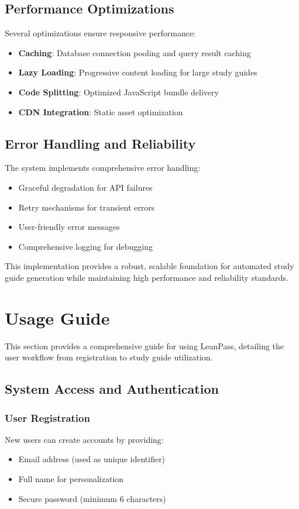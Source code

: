 \documentclass[conference]{IEEEtran}
\begin{document}
\subsection{Performance Optimizations}

Several optimizations ensure responsive performance:

\begin{itemize}
\item \textbf{Caching}: Database connection pooling and query result caching
\item \textbf{Lazy Loading}: Progressive content loading for large study guides
\item \textbf{Code Splitting}: Optimized JavaScript bundle delivery
\item \textbf{CDN Integration}: Static asset optimization
\end{itemize}

\subsection{Error Handling and Reliability}

The system implements comprehensive error handling:
\begin{itemize}
\item Graceful degradation for API failures
\item Retry mechanisms for transient errors
\item User-friendly error messages
\item Comprehensive logging for debugging
\end{itemize}

This implementation provides a robust, scalable foundation for automated study guide generation while maintaining high performance and reliability standards.

\section{Usage Guide}

This section provides a comprehensive guide for using LeanPass, detailing the user workflow from registration to study guide utilization.

\subsection{System Access and Authentication}

\subsubsection{User Registration}
New users can create accounts by providing:
\begin{itemize}
\item Email address (used as unique identifier)
\item Full name for personalization
\item Secure password (minimum 6 characters)
\end{itemize}
\end{document}
